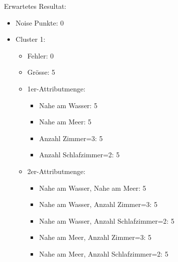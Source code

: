 Erwartetes Resultat:
\begin{itemize}
	\item Noise Punkte: 0
	\item Cluster 1:
	\begin{itemize}
		\item Fehler: 0
		\item Grösse: 5
			\item 1er-Attributmenge:
			\begin{itemize}
				\item Nahe am Wasser: 5
				\item Nahe am Meer: 5
				\item Anzahl Zimmer=3: 5
				\item Anzahl Schlafzimmer=2: 5
			\end{itemize}
			\item 2er-Attributmenge:
			\begin{itemize}
				\item Nahe am Wasser, Nahe am Meer: 5
				\item Nahe am Wasser, Anzahl Zimmer=3: 5
				\item Nahe am Wasser, Anzahl Schlafzimmer=2: 5
			
				\item Nahe am Meer, Anzahl Zimmer=3: 5
				\item Nahe am Meer, Anzahl Schlafzimmer=2: 5
			

\end{itemize}
\end{itemize}
\end{itemize}
